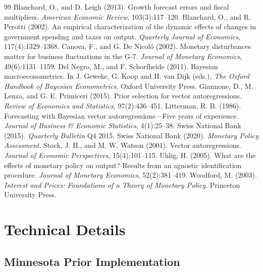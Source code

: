 \documentclass[11pt]{article}
\begin{document}
\begin{thebibliography}{99}
 Blanchard, O., and D. Leigh (2013). Growth forecast errors and fiscal multipliers. \emph{American Economic Review}, 103(3):117--120.
 Blanchard, O., and R. Perotti (2002). An empirical characterization of the dynamic effects of changes in government spending and taxes on output. \emph{Quarterly Journal of Economics}, 117(4):1329--1368.
 Canova, F., and G. De Nicol\'o (2002). Monetary disturbances matter for business fluctuations in the G-7. \emph{Journal of Monetary Economics}, 49(6):1131--1159.
 Del Negro, M., and F. Schorfheide (2011). Bayesian macroeconometrics. In J. Geweke, G. Koop and H. van Dijk (eds.), \emph{The Oxford Handbook of Bayesian Econometrics}. Oxford University Press.
 Giannone, D., M. Lenza, and G. E. Primiceri (2015). Prior selection for vector autoregressions. \emph{Review of Economics and Statistics}, 97(2):436--451.
 Litterman, R. B. (1986). Forecasting with Bayesian vector autoregressions---Five years of experience. \emph{Journal of Business \& Economic Statistics}, 4(1):25--38.
 Swiss National Bank (2015). \emph{Quarterly Bulletin} Q4 2015.
 Swiss National Bank (2020). \emph{Monetary Policy Assessment}.
 Stock, J. H., and M. W. Watson (2001). Vector autoregressions. \emph{Journal of Economic Perspectives}, 15(4):101--115.
 Uhlig, H. (2005). What are the effects of monetary policy on output? Results from an agnostic identification procedure. \emph{Journal of Monetary Economics}, 52(2):381--419.
 Woodford, M. (2003). \emph{Interest and Prices: Foundations of a Theory of Monetary Policy}. Princeton University Press.
\end{thebibliography}

\appendix
\section{Technical Details}

\subsection{Minnesota Prior Implementation}
\end{document}
